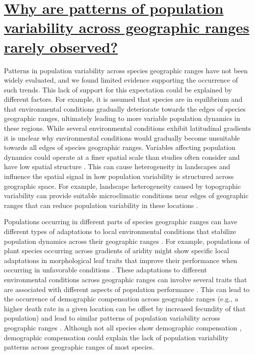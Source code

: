 \section*{\textbf{\uline{Why are patterns of population variability across geographic ranges rarely observed?}}}

Patterns in population variability across species geographic ranges have not been widely evaluated, and we found limited evidence supporting the occurrence of such trends. This lack of support for this expectation could be explained by different factors. For example, it is assumed that species are in equilibrium and that environmental conditions gradually deteriorate towards the edges of species geographic ranges, ultimately leading to more variable population dynamics in these regions. While several environmental conditions exhibit latitudinal gradients \parencite{frenne2013} it is unclear why environmental conditions would gradually become unsuitable towards all edges of species geographic ranges. Variables affecting population dynamics could operate at a finer spatial scale than studies often consider and have low spatial structure \parencite{lawton1993,pironon2017}. This can cause heterogeneity in landscapes and influence the spatial signal in how population variability is structured across geographic space. For example, landscape heterogeneity caused by topographic variability can provide suitable microclimatic conditions near edges of geographic ranges that can reduce population variability in these locations \parencite{oliver2010,carnicer2021}.


Populations occurring in different parts of species geographic ranges can have different types of adaptations to local environmental conditions that stabilize population dynamics across their geographic ranges \parencite{oldfather2018}. For example, populations of plant species occurring across gradients of aridity might show specific local adaptations in morphological leaf traits that improve their performance when occurring in unfavorable conditions \parencite{ramirez2014, carvajal2017}. These adaptations to different environmental conditions across geographic ranges can involve several traits that are associated with different aspects of population performance \parencite{emery2017, latron2023}. This can lead to the occurrence of demographic compensation across geographic ranges (e.g., a higher death rate in a given location can be offset by increased fecundity of that population) and lead to similar patterns of population variability across geographic ranges \parencite{doak2010, villellas2015}. Although not all species show demographic compensation \parencite{pironon2018,sheth2018,oldfather2021}, demographic compensation could explain the lack of population variability patterns across geographic ranges of most species.
 

